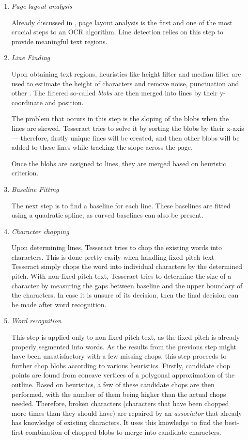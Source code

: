 \begin{enumerate}
    \item \emph{Page layout analysis}
    
    Already discussed in , page layout analysis is the first and one of the most crucial steps to an OCR algorithm. Line detection relies on this step to provide meaningful text regions.
    
    \item \emph{Line Finding}
     
     Upon obtaining text regions, heuristics like height filter and median filter are used to estimate the height of characters and remove noise, punctuation and other . The filtered so-called \emph{blobs} are then merged into lines by their y-coordinate and position.
     
     The problem that occurs in this step is the sloping of the blobs when the lines are skewed. Tesseract tries to solve it by sorting the blobs by their x-axis --- therefore, firstly unique lines will be created, and then other blobs will be added to these lines while tracking the slope across the page.
     
     Once the blobs are assigned to lines, they are merged based on heuristic criterion.
     
     \item \emph{Baseline Fitting}
    
    The next step is to find a baseline for each line. These baselines are fitted using a quadratic spline, as curved baselines can also be present.
    
    \item \emph{Character chopping}
    
    Upon determining lines, Tesseract tries to chop the existing words into characters. This is done pretty easily when handling fixed-pitch text --- Tesseract simply chops the word into individual characters by the determined pitch. With non-fixed-pitch text, Tesseract tries to determine the size of a character by measuring the gaps between baseline and the upper boundary of the characters. In case it is unsure of its decision, then the final decision can be made after word recognition.
    
    \item \emph{Word recognition}
    
    This step is applied only to non-fixed-pitch text, as the fixed-pitch is already properly segmented into words. As the results from the previous step might have been unsatisfactory with a few missing chops, this step proceeds to further chop blobs according to various heuristics. Firstly, candidate chop points are found from concave vertices of a polygonal approximation of the outline. Based on heuristics, a few of these candidate chops are then performed, with the number of them being higher than the actual chops needed. Therefore, broken characters (characters that have been chopped more times than they should have) are repaired by an \emph{associator} that already has knowledge of existing characters. It uses this knowledge to find the best-first combination of chopped blobs to merge into candidate characters.
    

\end{enumerate}
